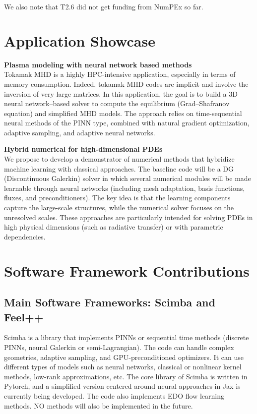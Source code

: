We also note that T2.6  did not get funding from NumPEx so far.

\section{Application Showcase}
% 
%  


\textbf{Plasma modeling with neural network based methods }\\

Tokamak MHD is a highly HPC-intensive application, especially in terms of memory consumption. Indeed, tokamak MHD codes are implicit and involve the inversion of very large matrices. In this application, the goal is to build a 3D neural network–based solver to compute the equilibrium (Grad–Shafranov equation) and simplified MHD models. The approach relies on time-sequential neural methods of the PINN type, combined with natural gradient optimization, adaptive sampling, and adaptive neural networks.

\textbf{Hybrid numerical for high-dimensional PDEs}\\

We propose to develop a demonstrator of numerical methods that hybridize machine learning with classical approaches. The baseline code will be a DG (Discontinuous Galerkin) solver in which several numerical modules will be made learnable through neural networks (including mesh adaptation, basis functions, fluxes, and preconditioners). The key idea is that the learning components capture the large-scale structures, while the numerical solver focuses on the unresolved scales. These approaches are particularly intended for solving PDEs in high physical dimensions (such as radiative transfer) or with parametric dependencies.
\section{Software Framework Contributions}

\subsection{Main Software Frameworks: Scimba and Feel++}

Scimba is a  library that implements PINNs or  sequential time methods
(discrete PINNs,  neural Galerkin  or semi-Lagrangian).  The  code can
handle complex  geometries, adaptive sampling,  and GPU-preconditioned
optimizers.   It can  use different  types  of models  such as  neural
networks,   classical   or    nonlinear   kernel   methods,   low-rank
approximations,  etc.   The  core  library of  Scimba  is  written  in
Pytorch, and a simplified version centered around neural approaches in
Jax is  currently being developed.  The code also implements  EDO flow
learning methods.  NO methods will also be implemented in the future.

